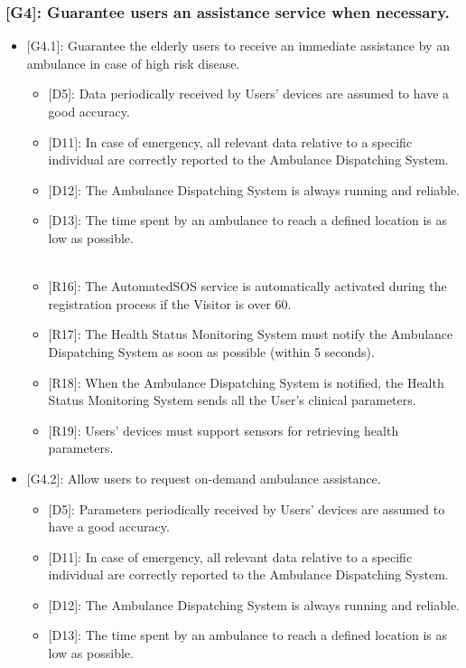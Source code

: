 \documentclass[12pt,a4paper]{article}
\begin{document}
	\subsubsection*{{[}{G4}{]}: Guarantee users an assistance service when necessary.}
		\begin{itemize}
			\item {[G4.1]}: Guarantee the elderly users to receive an immediate assistance by an ambulance in case of high risk disease.
			\begin{itemize}
				\item {[D5]}: Data periodically received by Users' devices are assumed to have a good accuracy.
				\item {[D11]}: In case of emergency, all relevant data relative to a specific individual are correctly reported to the Ambulance Dispatching System.
				\item {[D12]}: The Ambulance Dispatching System is always running and reliable.
				\item {[D13]}: The time spent by an ambulance to reach a defined location is as low as possible.
				\\ \\
				\item {[R16]}: The AutomatedSOS service is automatically activated during the registration process if the Visitor is over 60.
				\item {[R17]}: The Health Status Monitoring System must notify the Ambulance Dispatching System as soon as possible (within 5 seconds).
				\item {[R18]}: When the Ambulance Dispatching System is notified, the Health Status Monitoring System sends all the User's clinical parameters.
				\item {[R19]}: Users' devices must support sensors for retrieving health parameters.
			\end{itemize}
			\item {[G4.2]}: Allow users to request on-demand ambulance assistance.
			\begin{itemize}
				\item {[D5]}: Parameters periodically received by Users' devices are assumed to have a good accuracy.
				\item {[D11]}: In case of emergency, all relevant data relative to a specific individual are correctly reported to the Ambulance Dispatching System.
				\item {[D12]}: The Ambulance Dispatching System is always running and reliable.
				\item {[D13]}: The time spent by an ambulance to reach a defined location is as low as possible.

\end{itemize}
\end{itemize}
\end{document}
